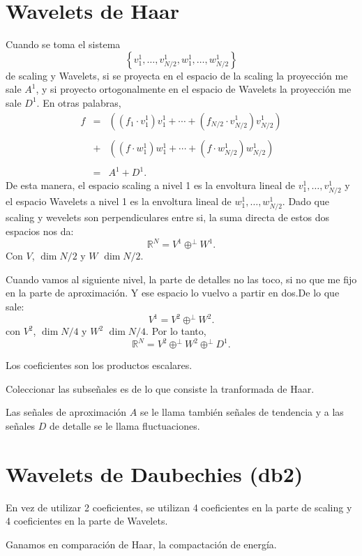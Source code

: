 \begin{paracol}{2}
\section{Wavelets de Haar}
Cuando se toma el sistema
$$\left\{v_1^1,\ldots,v_{N/2}^1,w_1^1,\ldots,w_{N/2}^1\right\}$$
de scaling y Wavelets, si se proyecta en el espacio de la scaling la proyección me sale $A^1$, y si proyecto ortogonalmente en el espacio de Wavelets la proyección me sale $D^1$. En otras palabras,
$$
\begin{array}{rcl}
    f&=&\left((f_1\cdot v_1^1)v_1^1+\cdots+(f_{N/2}\cdot v_{N/2}^1)v_{N/2}^1\right)\\\\
     &+& \left((f\cdot w_1^1)w_1^1+\cdots+(f\cdot w_{N/2}^1)w_{N/2}^1\right)\\\\
     &=&A^1+D^1.
\end{array}
$$
De esta manera, el espacio scaling a nivel 1 es la envoltura lineal de $v_1^1,\ldots,v_{N/2}^1$ y el espacio Wavelets a nivel 1 es la envoltura lineal de $w_1^1,\ldots,w_{N/2}^1$. Dado que scaling y wevelets son perpendiculares entre si, la suma directa de estos dos espacios nos da:
$$\mathbb{R}^N = V^1\oplus^\perp W^1.$$
Con $V$, $\dim N/2$ y $W$ $\dim N/2$.

Cuando vamos al siguiente nivel, la parte de detalles no las toco, si no que me fijo en la parte de aproximación. Y ese espacio lo vuelvo a partir en dos.De lo que sale:
$$V^1 = V^2\oplus^\perp W^2.$$
con $V^2$, $\dim N/4$ y $W^2$ $\dim N/4$.
Por lo tanto,
$$\mathbb{R}^N = V^2\oplus^\perp W^2\oplus^\perp D^1.$$

Los coeficientes son los productos escalares. 

Coleccionar las subseñales es de lo que consiste la tranformada de Haar. 

Las señales de aproximación $A$ se le llama también señales de tendencia y a las señales $D$ de detalle se le llama fluctuaciones.


\section{Wavelets de Daubechies (db2)}
En vez de utilizar 2 coeficientes, se utilizan 4 coeficientes en la parte de scaling y 4 coeficientes en la parte de Wavelets.

Ganamos en comparación de Haar, la compactación de energía.


\end{paracol}


